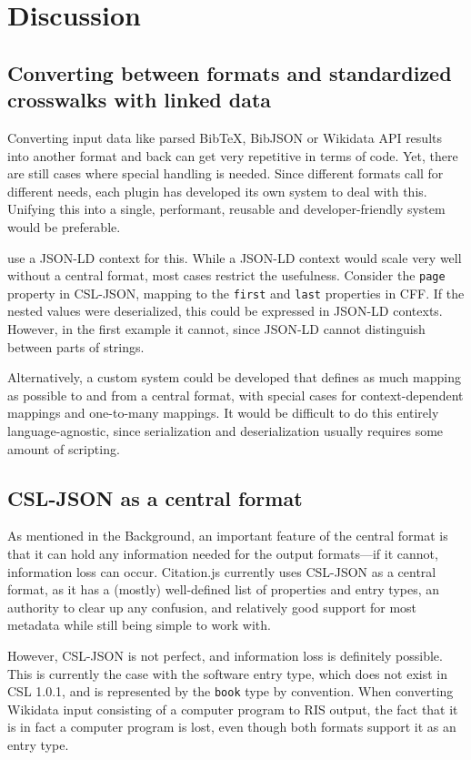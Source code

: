 \documentclass[fleqn,10pt,lineno]{wlpeerj} %
\begin{document}
\section*{Discussion}

\subsection*{Converting between formats and standardized crosswalks with linked data}

Converting input data like parsed BibTeX, BibJSON or Wikidata API results into another format and back can get very repetitive in terms of code. Yet, there are still cases where special handling is needed. Since different formats call for different needs, each plugin has developed its own system to deal with this. Unifying this into a single, performant, reusable and developer-friendly system would be preferable.

\cite{jones_codemeta:_2017} use a JSON-LD context for this. While a JSON-LD context would scale very well without a central format, most cases restrict the usefulness. Consider the \texttt{page} property in CSL-JSON, mapping to the \texttt{first} and \texttt{last} properties in CFF. If the nested values were deserialized, this could be expressed in JSON-LD contexts. However, in the first example it cannot, since JSON-LD cannot distinguish between parts of strings.

Alternatively, a custom system could be developed that defines as much mapping as possible to and from a central format, with special cases for context-dependent mappings and one-to-many mappings. It would be difficult to do this entirely language-agnostic, since serialization and deserialization usually requires some amount of scripting.

\subsection*{CSL-JSON as a central format}

As mentioned in the Background, an important feature of the central format is that it can hold any information needed for the output formats---if it cannot, information loss can occur. Citation.js currently uses CSL-JSON as a central format, as it has a (mostly) well-defined list of properties and entry types, an authority to clear up any confusion, and relatively good support for most metadata while still being simple to work with.

However, CSL-JSON is not perfect, and information loss is definitely possible. This is currently the case with the software entry type, which does not exist in CSL 1.0.1, and is represented by the \texttt{book} type by convention. When converting Wikidata input consisting of a computer program to RIS output, the fact that it is in fact a computer program is lost, even though both formats support it as an entry type.
\end{document}
